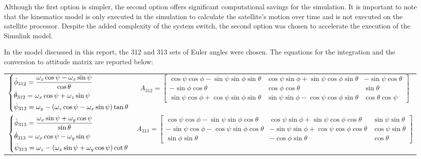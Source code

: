 Although the first option is simpler, the second option offers significant computational savings for the simulation. It is important to note that the kinematics model is only executed in the simulation to calculate the satellite's motion over time and is not executed on the satellite processor. Despite the added complexity of the system switch, the second option was chosen to accelerate the execution of the Simulink model.

In the model discussed in this report, the 312 and 313 sets of Euler angles were chosen. The equations for the integration and the conversion to attitude matrix are reported below:

{
\vspace*{10pt}
\centering
\small
\begin{tabular}{c c}
    $\begin{dcases}
        \dot{\phi}_{312} = \frac{\omega_z \cos \psi - \omega_x \sin \psi}{\cos \theta} \\
        \dot{\theta}_{312} = \omega_x \cos \psi + \omega_z \sin \psi \\
        \dot{\psi}_{312} = \omega_y - \left( \omega_z \cos \psi - \omega_x \sin \psi \right) \tan \theta
    \end{dcases}$
    &
    $A_{312} =
    \begin{bmatrix}
        \cos \psi \cos \phi - \sin \psi \sin \phi \sin \theta &
        \cos \psi \sin \phi + \sin \psi \cos \phi \sin \theta &
        -\sin \psi \cos \theta \\
        -\sin \phi \cos \theta & \cos \phi \cos \theta & \sin \theta \\
        \sin \psi \cos \phi + \cos \psi \sin \phi \sin \theta &
        \sin \psi \sin \phi - \cos \psi \cos \phi \sin \theta &
        \cos \theta \cos \psi
    \end{bmatrix}$
    \\[1cm]
    $\begin{dcases}
        \dot{\phi}_{313} = \frac{\omega_x \sin \psi + \omega_y \cos \psi}{\sin \theta} \\
        \dot{\theta}_{313} = \omega_x \cos \psi - \omega_y \sin \psi \\
        \dot{\psi}_{313} = \omega_z - \left( \omega_x \sin \psi + \omega_y \cos \psi \right) \cot \theta
    \end{dcases}$
    &
    $A_{313} =
    \begin{bmatrix}
        \cos \psi \cos \phi - \sin \psi \sin \phi \cos \theta &
        \cos \psi \sin \phi + \sin \psi \cos \phi \cos \theta &
        \sin \psi \sin \theta \\
        -\sin \psi \cos \phi - \cos \psi \sin \phi \cos \theta &
        -\sin \psi \sin \phi + \cos \psi \cos \phi \cos \theta &
        \cos \psi \sin \theta \\
        \sin \phi \sin \theta & -\cos \phi \sin \theta & \cos \theta
    \end{bmatrix}$
\end{tabular}
\par
\vspace*{10pt}
}

